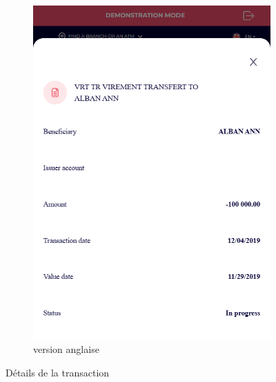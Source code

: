 \begin{figure}[!ht]
\begin{subfigure}[b]{0.49\textwidth}
        \includegraphics[width=\textwidth]{images/screens/cards/mob-details.png}
        \caption{version anglaise}
    \end{subfigure}
       \caption{Détails de la transaction}
\end{figure}

\newpage


